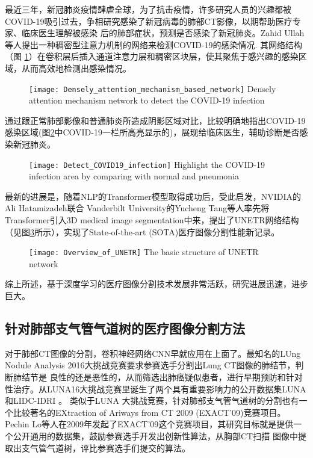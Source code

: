 	最近三年，新冠肺炎疫情肆虐全球，为了抗击疫情，许多研究人员的兴趣都被COVID-19吸引过去，争相研究感染了新冠病毒的肺部CT影像，以期帮助医疗专家、临床医生理解被感染
	后的肺部症状，预测是否感染了新冠肺炎。Zahid Ullah等人\cite{Ullah2023DenselyAM}提出一种稠密型注意力机制的网络来检测COVID-19的感染情况. 其网络结构（图
	\ref{fig:COVID19}）在卷积层后插入通道注意力层和稠密区块层，使其聚焦于感兴趣的感染区域，从而高效地检测出感染情况。
	\begin{figure}[htp]
		\centering
		\texttt{[image: Densely\_attention\_mechanism\_based\_network]}
			{Densely attention mechanism network to detect the COVID-19 infection}
		\label{fig:COVID19}
	\end{figure}
	通过跟正常肺部影像和普通肺炎所造成阴影区域对比，比较明确地指出COVID-19感染区域(图\ref{fig:COVID19_detection}中COVID-19一栏所高亮显示的)，展现给临床医生，辅助诊断是否感染新冠肺炎。
	\begin{figure}[ht]
		\centering
		\texttt{[image: Detect\_COVID19\_infection]}
			{Highlight the COVID-19 infection area by comparing with normal and pneumonia}
		\label{fig:COVID19_detection}
	\end{figure}
	
	最新的进展是，随着NLP的Transformer模型\cite{Devlin2019BERTPO, NIPS2017Attention}取得成功后，受此启发，NVIDIA的Ali Hatamizadeh联合
	Vanderbilt University的Yucheng Tang等人\cite{unetr}率先将Transformer引入3D medical image segmentation中来，提出了UNETR网络结构
	（见图\ref{fig:UNETR}所示），实现了State-of-the-art (SOTA)医疗图像分割性能新记录。
	\begin{figure}[hbp]
		\centering
		\texttt{[image: Overview\_of\_UNETR]}
			{The basic structure of UNETR network}
		\label{fig:UNETR}
	\end{figure}
	
	综上所述，基于深度学习的医疗图像分割技术发展非常活跃，研究进展迅速，进步巨大。
	
	
	
	\subsection{针对肺部支气管气道树的医疗图像分割方法}
	对于肺部CT图像的分割，卷积神经网络CNN早就应用在上面了。最知名的LUng Nodule Analysis 2016大挑战竞赛要求参赛选手分割出Lung CT图像的肺结节，判断肺结节是
	良性的还是恶性的，从而筛选出肺癌疑似患者，进行早期预防和针对性治疗。从LUNA16大挑战竞赛里诞生了两个具有重要影响力的公开数据集LUNA和LIDC-IDRI
	\cite{Charles2011LIDC}。 类似于LUNA	大挑战竞赛，针对肺部支气管气道树的分割也有一个比较著名的EXtraction of Ariways from CT 2009 (EXACT'09)竞赛项目。
	Pechin Lo等人\cite{Lo2012ExtractionOA}在2009年发起了EXACT'09这个竞赛项目，其研究目标就是提供一个公开通用的数据集，鼓励参赛选手开发出创新性算法，从胸部CT扫描
	图像中提取出支气管气道树，评比参赛选手们提交的算法。
	
